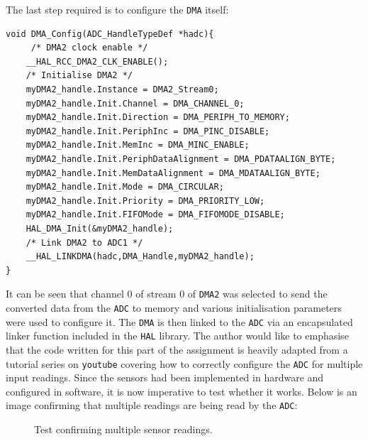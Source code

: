\documentclass[12pt]{article}
\begin{document}
The last step required is to configure the \texttt{DMA} itself:
\begin{verbatim}
void DMA_Config(ADC_HandleTypeDef *hadc){
     /* DMA2 clock enable */
    __HAL_RCC_DMA2_CLK_ENABLE();
    /* Initialise DMA2 */
    myDMA2_handle.Instance = DMA2_Stream0;
    myDMA2_handle.Init.Channel = DMA_CHANNEL_0;
    myDMA2_handle.Init.Direction = DMA_PERIPH_TO_MEMORY;
    myDMA2_handle.Init.PeriphInc = DMA_PINC_DISABLE;
    myDMA2_handle.Init.MemInc = DMA_MINC_ENABLE;
    myDMA2_handle.Init.PeriphDataAlignment = DMA_PDATAALIGN_BYTE;
    myDMA2_handle.Init.MemDataAlignment = DMA_MDATAALIGN_BYTE;
    myDMA2_handle.Init.Mode = DMA_CIRCULAR;
    myDMA2_handle.Init.Priority = DMA_PRIORITY_LOW;
    myDMA2_handle.Init.FIFOMode = DMA_FIFOMODE_DISABLE;
    HAL_DMA_Init(&myDMA2_handle);
    /* Link DMA2 to ADC1 */
    __HAL_LINKDMA(hadc,DMA_Handle,myDMA2_handle);
}
\end{verbatim}
It can be seen that channel 0 of stream 0 of \texttt{DMA2} was selected to send the converted data from the \texttt{ADC} to memory and various initialisation parameters were used to configure it. The \texttt{DMA} is then linked to the \texttt{ADC} via an encapsulated linker function included in the \texttt{HAL} library. The author would like to emphasise that the code written for this part of the assignment is heavily adapted from a tutorial series on \texttt{youtube} covering how to correctly configure the \texttt{ADC} for multiple input readings\cite{MUTEX}. Since the sensors had been implemented in hardware and configured in software, it is now imperative to test whether it works. Below is an image confirming that multiple readings are being read by the \texttt{ADC}:
\begin{figure}[ht]
    \centering
    \caption{Test confirming multiple sensor readings.}
    \label{fig:sensor}
\end{figure}
\end{document}
